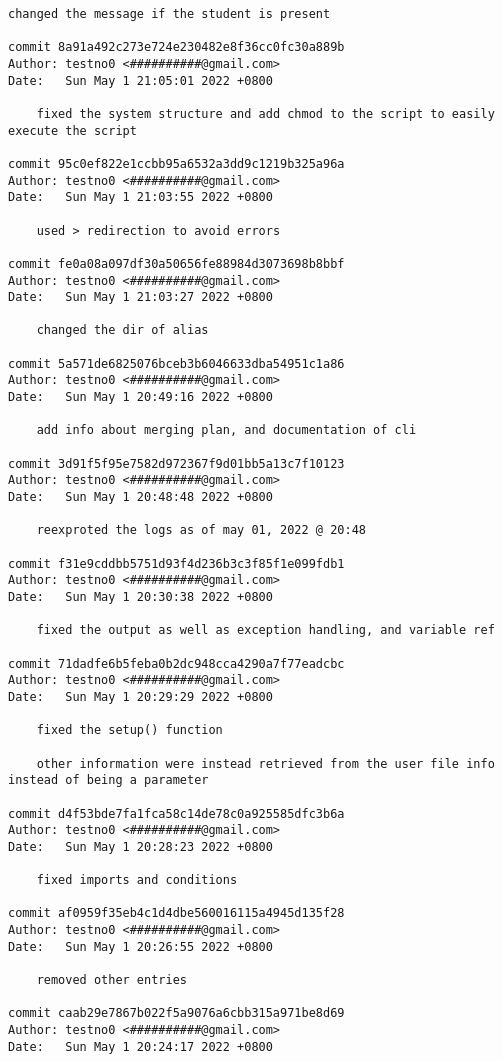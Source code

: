 \documentclass[12pt]{article}
\begin{document}
\begin{lstlisting}[caption={\texttt{git} log of the development.}]
	changed the message if the student is present

commit 8a91a492c273e724e230482e8f36cc0fc30a889b
Author: testno0 <##########@gmail.com>
Date:   Sun May 1 21:05:01 2022 +0800

	fixed the system structure and add chmod to the script to easily execute the script

commit 95c0ef822e1ccbb95a6532a3dd9c1219b325a96a
Author: testno0 <##########@gmail.com>
Date:   Sun May 1 21:03:55 2022 +0800

	used > redirection to avoid errors

commit fe0a08a097df30a50656fe88984d3073698b8bbf
Author: testno0 <##########@gmail.com>
Date:   Sun May 1 21:03:27 2022 +0800

	changed the dir of alias

commit 5a571de6825076bceb3b6046633dba54951c1a86
Author: testno0 <##########@gmail.com>
Date:   Sun May 1 20:49:16 2022 +0800

	add info about merging plan, and documentation of cli

commit 3d91f5f95e7582d972367f9d01bb5a13c7f10123
Author: testno0 <##########@gmail.com>
Date:   Sun May 1 20:48:48 2022 +0800

	reexproted the logs as of may 01, 2022 @ 20:48

commit f31e9cddbb5751d93f4d236b3c3f85f1e099fdb1
Author: testno0 <##########@gmail.com>
Date:   Sun May 1 20:30:38 2022 +0800

	fixed the output as well as exception handling, and variable ref

commit 71dadfe6b5feba0b2dc948cca4290a7f77eadcbc
Author: testno0 <##########@gmail.com>
Date:   Sun May 1 20:29:29 2022 +0800

	fixed the setup() function

	other information were instead retrieved from the user file info instead of being a parameter

commit d4f53bde7fa1fca58c14de78c0a925585dfc3b6a
Author: testno0 <##########@gmail.com>
Date:   Sun May 1 20:28:23 2022 +0800

	fixed imports and conditions

commit af0959f35eb4c1d4dbe560016115a4945d135f28
Author: testno0 <##########@gmail.com>
Date:   Sun May 1 20:26:55 2022 +0800

	removed other entries

commit caab29e7867b022f5a9076a6cbb315a971be8d69
Author: testno0 <##########@gmail.com>
Date:   Sun May 1 20:24:17 2022 +0800


\end{lstlisting}
\end{document}
